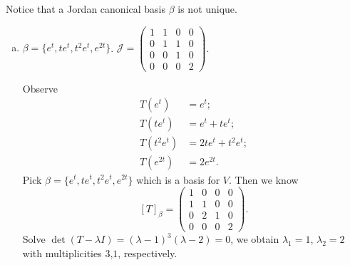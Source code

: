 \begin{Exercise}
Notice that a Jordan canonical basis $\beta$ is not unique.
\begin{enumerate}[(a)]
\item
\begin{answer}
$\beta = \{e^t, t e^t, t^2 e^t, e^{2t}\}$. $\mathcal{J} = \begin{pmatrix}
1 & 1 & 0 & 0 \\
0 & 1 & 1 & 0 \\
0 & 0 & 1 & 0 \\
0 & 0 & 0 & 2
\end{pmatrix}$. 
\end{answer}
\begin{solution}
Observe
\begin{align*}
T(e^t) &= e^t; \\
T(t e^t) &= e^t + t e^t; \\
T(t^2 e^t) &= 2t e^t + t^2 e^t; \\
T(e^{2t}) &= 2e^{2t}.
\end{align*}
Pick $\beta = \{e^t, t e^t, t^2 e^t, e^{2t}\}$ which is a basis for $V$. Then we know
$$
[T]_{\beta} = \begin{pmatrix}
1 & 0 & 0 & 0 \\
1 & 1 & 0 & 0 \\
0 & 2 & 1 & 0 \\
0 & 0 & 0 & 2
\end{pmatrix}.
$$
Solve $\det(T-\lambda I) = (\lambda-1)^3 (\lambda-2) = 0$, we obtain $\lambda_1 = 1$, $\lambda_2 = 2$ with multiplicities $3$,$1$, respectively.


\end{solution}
\end{enumerate}
\end{Exercise}
